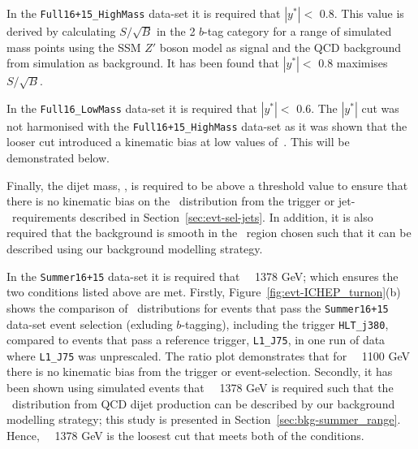 In the \verb|Full16+15_HighMass| data-set it is required that $|y^*| <$ 0.8.
This value is derived by calculating $S/\sqrt{B}$ in the 2 $b$-tag category for a range of simulated mass points
using the SSM $Z'$ boson model as signal and the QCD background from simulation as background.
It has been found that $|y^*| <$ 0.8 maximises $S/\sqrt{B}$.

In the \verb|Full16_LowMass| data-set it is required that $|y^*| <$ 0.6.
The $|y^*|$ cut was not harmonised with the \verb|Full16+15_HighMass| data-set
as it was shown that the looser cut introduced a kinematic bias at low values of~\mjj.
This will be demonstrated below.

Finally, the dijet mass, \mjj, is required to be above a threshold value
to ensure that there is no kinematic bias on the \mjj~distribution
from the trigger or jet-\pT~requirements described in Section~\ref{sec:evt-sel-jets}.
In addition, it is also required that the background is smooth in the \mjj~region chosen
such that it can be described using our background modelling strategy.

In the \verb|Summer16+15| data-set it is required that \mjj~\gt~1378 GeV;
which ensures the two conditions listed above are met.
Firstly, Figure~\ref{fig:evt-ICHEP_turnon}(b) shows the comparison of \mjj~distributions for events
that pass the \verb|Summer16+15| data-set event selection (exluding $b$-tagging), including the trigger \verb|HLT_j380|,
compared to events that pass a reference trigger, \verb|L1_J75|,
in one run of data where \verb|L1_J75| was unprescaled.
The ratio plot demonstrates that for \mjj~\gt~1100 GeV there is no kinematic bias from the trigger or event-selection.
Secondly, it has been shown using simulated events that
\mjj~\gt~1378 GeV is required such that the \mjj~distribution from QCD dijet production
can be described by our background modelling strategy;
this study is presented in Section~\ref{sec:bkg-summer_range}.
Hence, \mjj~\gt~1378 GeV is the loosest cut that meets both of the conditions.

